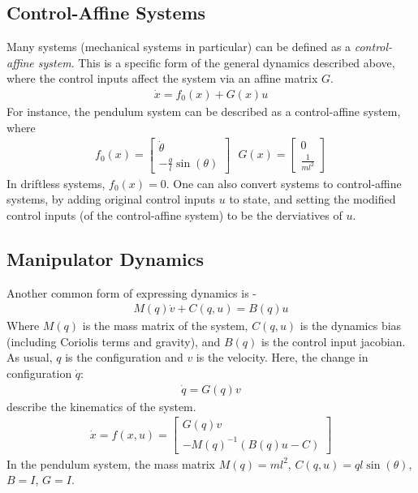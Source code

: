 \subsection{Control-Affine Systems}
Many systems (mechanical systems in particular) can be defined as a \textit{control-affine system}. This is a specific form of the general dynamics described above, where the control inputs affect the system via an affine matrix $G$. 
\begin{align}
    \dot{x} = f_{0} (x) + G(x) u 
\end{align}
For instance, the pendulum system can be described as a control-affine system, where 
\begin{align}
    f_{0}(x) = \begin{bmatrix}
        \dot{\theta} \\
        - \frac{g}{l} \sin(\theta)
    \end{bmatrix}
    \ \ \
    G(x) = \begin{bmatrix}
        0 \\
        \frac{1}{ml^2}
    \end{bmatrix}
\end{align}
In driftless systems, $f_{0}(x)=0$. One can also convert systems to control-affine systems, by adding original control inputs $u$ to state, and setting the modified control inputs (of the control-affine system) to be the derviatives of $u$.

\subsection{Manipulator Dynamics}
Another common form of expressing dynamics is - 
\begin{align}
    M(q) \dot{v} + C(q,u) = B(q) u
\end{align}
Where $M(q)$ is the mass matrix of the system, $C(q,u)$ is the dynamics bias (including Coriolis terms and gravity), and $B(q)$ is the control input jacobian. As usual, $q$  is the configuration and $v$ is the velocity. 
Here, the change in configuration $\dot{q}$:
\begin{align}
    \dot{q} = G(q) v
\end{align}
describe the kinematics of the system.
\begin{align}
    \dot{x} = f(x,u) = \begin{bmatrix}
        G(q) v \\
        -{M(q)}^{-1} ( B(q) u - C ) 
    \end{bmatrix}
\end{align}
In the pendulum system, the mass matrix $M(q) = ml^2$, $C(q,u) = q l \sin(\theta)$, $B=I$, $G=I$.\\

